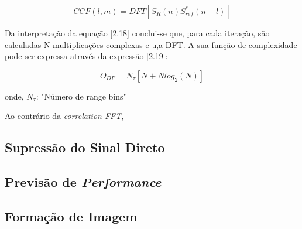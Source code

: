 \begin{equation} \label{2.18}
CCF\left(l,m\right) = DFT\left[ S_{R}\left( n\right)S_{ref}^{\ast}\left(n-l\right)\right] 
\end{equation}

Da interpretação da equação \ref{2.18} conclui-se que, para cada iteração, são calculadas N multiplicações complexas e u,a \gls{DFT}. A sua função de complexidade pode ser expressa através da expressão \ref{2.19}:


\begin{equation} \label{2.17}
O_{DF}=N_{\tau}[N+Nlog_{2}(N)]
\end{equation}

onde,
$N_{\tau}$: "Número de range bins"

Ao contrário da \textit{correlation FFT},




\subsection{Supressão do Sinal Direto}




\subsection{Previsão de \textit{Performance}}



\subsection{Formação de Imagem}

